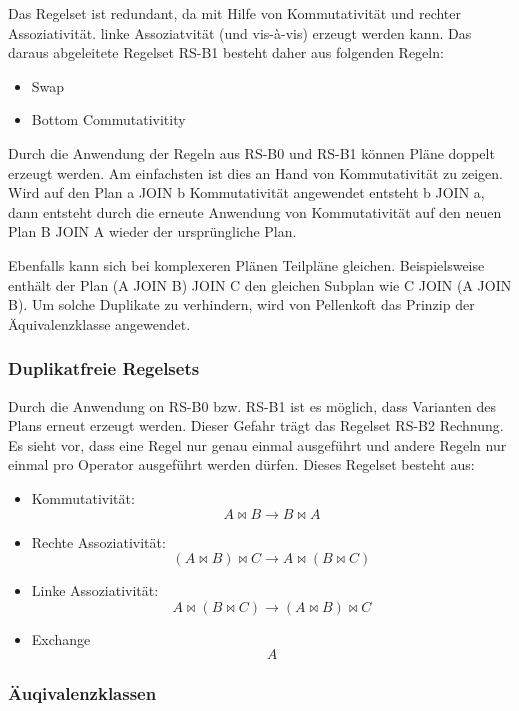 Das Regelset ist redundant, da mit Hilfe von Kommutativität und rechter Assoziativität. linke Assoziatvität (und vis-à-vis) erzeugt werden kann. Das daraus abgeleitete Regelset RS-B1 besteht daher aus folgenden Regeln:

\begin{itemize}
\item Swap
\item Bottom Commutativitity
\end{itemize}

Durch die Anwendung der Regeln aus RS-B0 und RS-B1 können Pläne doppelt erzeugt werden. Am einfachsten ist dies an Hand von Kommutativität zu zeigen. Wird auf den Plan a JOIN b Kommutativität angewendet entsteht b JOIN a, dann entsteht durch  die erneute Anwendung von Kommutativität auf den neuen Plan B JOIN A wieder der ursprüngliche Plan.

Ebenfalls kann sich bei komplexeren Plänen Teilpläne gleichen. Beispielsweise enthält der Plan (A JOIN B) JOIN C den gleichen Subplan wie C JOIN (A JOIN B). Um solche Duplikate zu verhindern, wird von Pellenkoft das Prinzip der Äquivalenzklasse  angewendet.



\subsubsection{Duplikatfreie Regelsets}
Durch die Anwendung on RS-B0 bzw. RS-B1 ist es möglich, dass Varianten des Plans erneut erzeugt werden. Dieser Gefahr trägt das Regelset RS-B2 Rechnung. Es sieht vor, dass eine Regel nur genau einmal ausgeführt und andere Regeln nur einmal pro Operator ausgeführt werden dürfen. Dieses Regelset besteht aus:


\begin{itemize}
\item Kommutativität: $$ A \Join B \to B \Join A$$
\item Rechte Assoziativität: $$(A \Join B) \Join C \to A \Join (B \Join C) $$
\item Linke Assoziativität: $$A \Join (B \Join C) \to (A \Join B) \Join C$$

\item Exchange $$A$$
\end{itemize}

\subsubsection{Äuqivalenzklassen}

